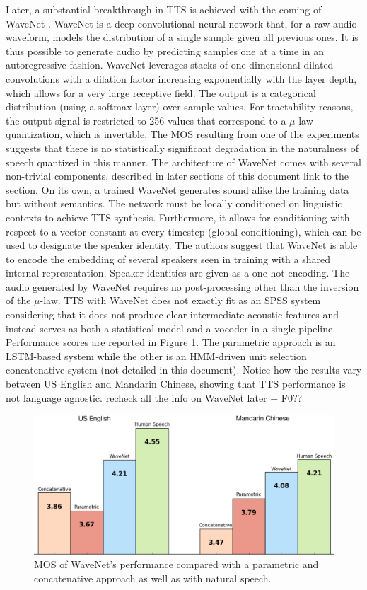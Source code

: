\documentclass[a4paper, oneside, 12pt, english]{article}
\begin{document}
Later, a substantial breakthrough in TTS is achieved with the coming of WaveNet \citep{WaveNet}. WaveNet is a deep convolutional neural network that, for a raw audio waveform, models the distribution of a single sample given all previous ones. It is thus possible to generate audio by predicting samples one at a time in an autoregressive fashion. WaveNet leverages stacks of one-dimensional dilated convolutions with a dilation factor increasing exponentially with the layer depth, which allows for a very large receptive field.
The output is a categorical distribution (using a softmax layer) over sample values. For tractability reasons, the output signal is restricted to 256 values that correspond to a $\mu$-law quantization, which is invertible. The MOS resulting from one of the experiments suggests that there is no statistically significant degradation in the naturalness of speech quantized in this manner. The architecture of WaveNet comes with several non-trivial components, described in later sections of this document \color{red}link to the section\color{black}. On its own, a trained WaveNet generates sound alike the training data but without semantics. The network must be locally conditioned on linguistic contexts to achieve TTS synthesis. Furthermore, it allows for conditioning with respect to a vector constant at every timestep (global conditioning), which can be used to designate the speaker identity. The authors suggest that WaveNet is able to encode the embedding of several speakers seen in training with a shared internal representation. Speaker identities are given as a one-hot encoding. The audio generated by WaveNet requires no post-processing other than the inversion of the $\mu$-law. TTS with WaveNet does not exactly fit as an SPSS system considering that it does not produce clear intermediate acoustic features and instead serves as both a statistical model and a vocoder in a single pipeline. Performance scores are reported in Figure \ref{wavenet_results}. The parametric approach is an LSTM-based system while the other is an HMM-driven unit selection concatenative system (not detailed in this document). Notice how the results vary between US English and Mandarin Chinese, showing that TTS performance is not language agnostic. \color{red} recheck all the info on WaveNet later + F0??\color{black}

\begin{figure}[h]
	\centering
	\includegraphics[width=.7\linewidth]{images/wavenet_results_chart.png}
	\caption{MOS of WaveNet's performance compared with a parametric and concatenative approach as well as with natural speech.}
	\label{wavenet_results}
\end{figure}
\end{document}

